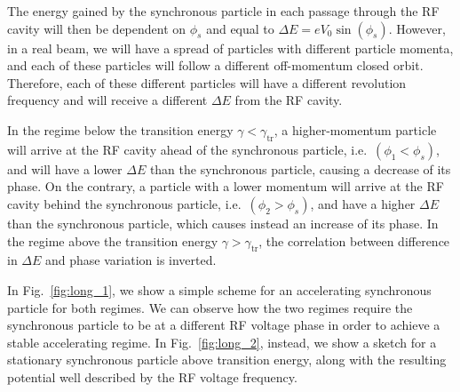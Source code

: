 The energy gained by the synchronous particle in each passage through the RF cavity will then be dependent on $\phi_s$ and equal to $\Delta E=e V_0 \sin \left(\phi_s\right)$. However, in a real beam, we will have a spread of particles with different particle momenta, and each of these particles will follow a different off-momentum closed orbit. Therefore, each of these different particles will have a different revolution frequency and will receive a different $\Delta E$ from the RF cavity.

In the regime below the transition energy $\gamma < \gamma_\text{tr}$, a higher-momentum particle will arrive at the RF cavity ahead of the synchronous particle, i.e.\ $\left(\phi_1<\phi_s\right)$, and will have a lower $\Delta E$ than the synchronous particle, causing a decrease of its phase. On the contrary, a particle with a lower momentum will arrive at the RF cavity behind the synchronous particle, i.e.\ $\left(\phi_2>\phi_s\right)$, and have a higher $\Delta E$ than the synchronous particle, which causes instead an increase of its phase. In the regime above the transition energy $\gamma > \gamma_\text{tr}$, the correlation between difference in $\Delta E$ and phase variation is inverted.

In Fig.~\ref{fig:long_1}, we show a simple scheme for an accelerating synchronous particle for both regimes. We can observe how the two regimes require the synchronous particle to be at a different RF voltage phase in order to achieve a stable accelerating regime. In Fig.~\ref{fig:long_2}, instead, we show a sketch for a stationary synchronous particle above transition energy, along with the resulting potential well described by the RF voltage frequency.

